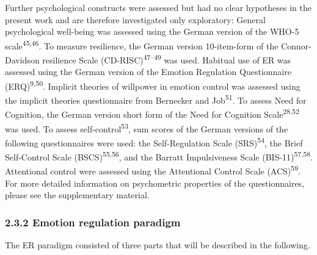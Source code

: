 \documentclass[
  man,floatsintext]{apa6}
\begin{document}
Further psychological constructs were assessed but had no clear hypotheses in the present work and are therefore investigated only exploratory:
General psychological well-being was assessed using the German version of the WHO-5 scale\textsuperscript{45,46}.
To measure resilience, the German version 10-item-form of the Connor-Davidson resilience Scale (CD-RISC)\textsuperscript{47--49} was used.
Habitual use of ER was assessed using the German version of the Emotion Regulation Questionnaire (ERQ)\textsuperscript{9,50}.
Implicit theories of willpower in emotion control was assessed using the implicit theories questionnaire from Bernecker and Job\textsuperscript{51}.
To assess Need for Cognition, the German version short form of the Need for Cognition Scale\textsuperscript{28,52} was used.
To assess self-control\textsuperscript{53}, sum scores of the German versions of the following questionnaires were used: the Self-Regulation Scale (SRS)\textsuperscript{54}, the Brief Self-Control Scale (BSCS)\textsuperscript{55,56}, and the Barratt Impulsiveness Scale (BIS-11)\textsuperscript{57,58}.
Attentional control were assessed using the Attentional Control Scale (ACS)\textsuperscript{59}.
For more detailed information on psychometric properties of the questionnaires, please see the supplementary material.

\hypertarget{emotion-regulation-paradigm}{%
\subsubsection{2.3.2 Emotion regulation paradigm}\label{emotion-regulation-paradigm}}

The ER paradigm consisted of three parts that will be described in the following.
\end{document}
